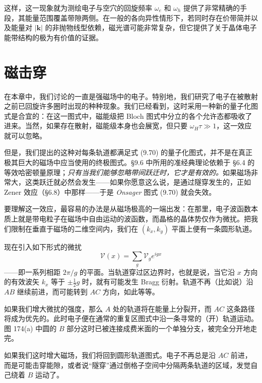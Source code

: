 这样，这一现象就为测绘电子与空穴的回旋频率 $\omega_{e}$ 和 $\omega_{h}$ 提供了非常精确的手段，其能量范围覆盖带隙两侧。在一般的各向异性情形下，若同时存在价带简并以及能量对 $|\mathbf{k}|$ 的非抛物线型依赖，磁光谱可能非常复杂，但它提供了关于晶体电子能带结构的极为有价值的证据。

\section{磁击穿}

在本章中，我们讨论的一直是强磁场中的电子。特别地，我们研究了电子在被散射之前已回旋许多圈时出现的种种现象。我们已经看到，这时采用一种新的量子化图式是合宜的：在这一图式中，磁能级把 Bloch 图式中分立的各个允许态都吸收了进来。当然，如果存在散射，磁能级本身也会展宽，但只要 $\omega_{H}\tau\gg 1$，这一效应就可以忽略。

但是，我们提出的这种对每条轨道都满足式 (9.70) 的量子化图式，并不是在真正极其巨大的磁场中应当使用的终极图式。§9.6 中所用的准经典理论依赖于 §6.4 的等效哈密顿量原理；\emph{只有当我们能够忽略带间跃迁时，它才是有效的。}如果磁场非常大，这类跃迁就必然会发生——如果你愿意这么说，是通过隧穿发生的，正如 Zener 效应（§6.8）中那样——于是 \emph{Onsager} 图式 (9.70) 就会失效。

要理解这一效应，最容易的办法是从磁场极高的一端出发：在那里，电子波函数本质上就是带电粒子在磁场中自由运动的波函数，而晶格的晶体势仅作为微扰。把我们限制在垂直于磁场的二维空间内，我们在 $(k_{x},k_{y})$ 平面上便有一条圆形轨道。

现在引入如下形式的微扰
\begin{equation*}
\mathcal{V}(x)=\sum_{g}\mathcal{V}_{g}e^{igx}
\tag{9.96}
\end{equation*}
——即一系列相距 $2\pi/g$ 的平面。当轨道穿过区边界时，也就是说，当它沿 $x$ 方向的有效波矢 $k_{x}$ 等于 $\pm\frac{1}{2}g$ 时，就有可能发生 Bragg 衍射。轨道不再（比如说）沿 $AB$ 继续前进，而可能转到 $AC$ 方向，如此等等。


如果我们增大微扰的强度，那么 $A$ 处的轨道将在能量上分裂开，而 $AC$ 这条路径将成为优先的。此时电子便在通常的重复区图式中沿一条寻常的（开）轨道运动。图 174(a) 中圆的 $B$ 部分这时已被连接成费米面的一个单独分支，被完全分开地走完。

如果我们这时增大磁场，我们将回到圆形轨道图式。电子不再总是沿 $AC$ 前进，而是可能击穿能隙，或者说“隧穿”通过倒格子空间中分隔两条轨道的区域，发觉自己绕着 $B$ 运动了。

